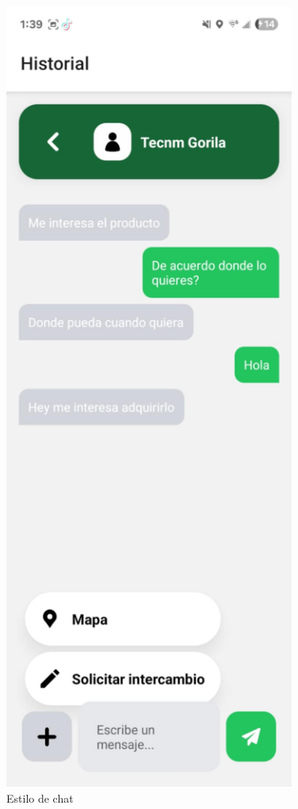 \documentclass[11pt, a4paper, oneside]{book}
\begin{document}
\begin{figure}[H]
\begin{minipage}[b]{0.25\textwidth}
    \end{minipage}
    \hspace{0.03\textwidth} %
    \begin{minipage}[b]{0.3\textwidth}
        \centering
        \includegraphics[width=0.85\textwidth]{Pictures/3-2.png}
    \end{minipage}
             \caption{Estilo de chat}
\end{figure}
\end{document}
